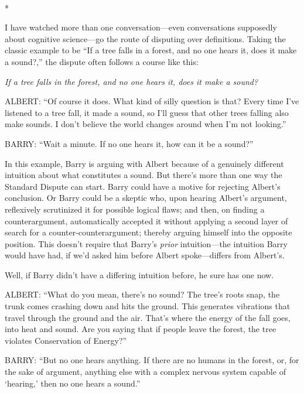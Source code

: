{\centering
 \ ~
\par}

{\centering
 *
\par}


{
 I have watched more than one conversation---even conversations
supposedly about cognitive science---go the route of disputing over
definitions. Taking the classic example to be ``If a
tree falls in a forest, and no one hears it, does it make a
sound?,'' the dispute often follows a course like
this:}

{
 \textit{If a tree falls in the forest, and no one hears it, does
it make a sound?}}

{
 ALBERT: ``Of course it does. What kind of silly
question is that? Every time I've listened to a tree
fall, it made a sound, so I'll guess that other trees
falling also make sounds. I don't believe the world
changes around when I'm not
looking.''}

{
 BARRY: ``Wait a minute. If no one hears it, how
can it be a sound?''}

{
 In this example, Barry is arguing with Albert because of a
genuinely different intuition about what constitutes a sound. But
there's more than one way the Standard Dispute can
start. Barry could have a motive for rejecting Albert's
conclusion. Or Barry could be a skeptic who, upon hearing
Albert's argument, reflexively scrutinized it for
possible logical flaws; and then, on finding a counterargument,
automatically accepted it without applying a second layer of search for
a counter-counterargument; thereby arguing himself into the opposite
position. This doesn't require that
Barry's \textit{prior} intuition---the intuition Barry
would have had, if we'd asked him before Albert
spoke---differs from Albert's.}

{
 Well, if Barry didn't have a differing intuition
before, he sure has one now.}

{
 ALBERT: ``What do you mean,
there's no sound? The tree's roots
snap, the trunk comes crashing down and hits the ground. This generates
vibrations that travel through the ground and the air.
That's where the energy of the fall goes, into heat and
sound. Are you saying that if people leave the forest, the tree
violates Conservation of Energy?''}

{
 BARRY: ``But no one hears anything. If there are
no humans in the forest, or, for the sake of argument, anything else
with a complex nervous system capable of
`hearing,' then no one hears a
sound.''}

